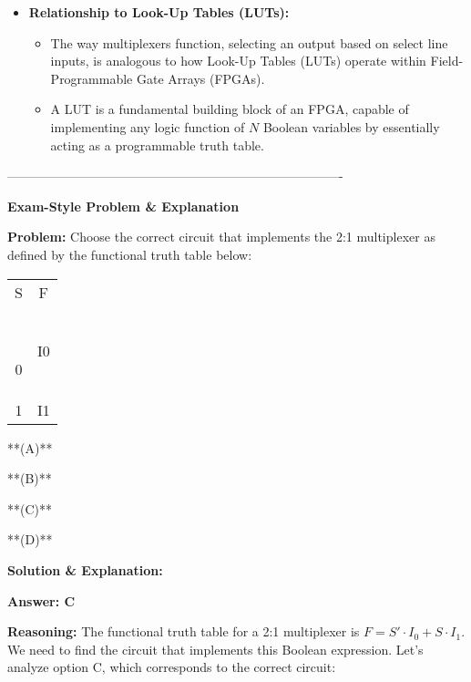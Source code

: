 \documentclass{article}
\begin{document}
\begin{itemize}
\begin{itemize}
\begin{itemize}
    \end{itemize}
    \item \textbf{Relationship to Look-Up Tables (LUTs):}
    \begin{itemize}
        \item The way multiplexers function, selecting an output based on select line inputs, is analogous to how Look-Up Tables (LUTs) operate within Field-Programmable Gate Arrays (FPGAs).
        \item A LUT is a fundamental building block of an FPGA, capable of implementing any logic function of $N$ Boolean variables by essentially acting as a programmable truth table.
    \end{itemize}
\end{itemize}

\-------------------------------------------------------------------------------- 

\textbf{Exam-Style Problem \& Explanation}

\textbf{Problem:} Choose the correct circuit that implements the 2:1 multiplexer as defined by the functional truth table below:

\begin{tabular}{ c | c } 
S & F \\\ \hline


0 & I0 \\
1 & I1 \\


\end{tabular}





**(A)** 

**(B)** 

**(C)** 

**(D)** 

\textbf{Solution \& Explanation:}

\textbf{Answer: C}

\textbf{Reasoning:} The functional truth table for a 2:1 multiplexer is $F = S' \cdot I_0 + S \cdot I_1$. We need to find the circuit that implements this Boolean expression. Let's analyze option C, which corresponds to the correct circuit:


\end{itemize}
\end{document}
